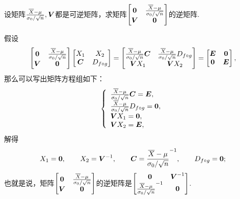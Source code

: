 \begin{example}
设矩阵\(\P,\Q\)都是可逆矩阵，求矩阵\(\begin{bmatrix}
	\z & \P \\
	\Q & \z
\end{bmatrix}\)的逆矩阵.
\begin{solution}
假设\[
	\begin{bmatrix}
		\z & \P \\
		\Q & \z
	\end{bmatrix}
	\begin{bmatrix}
		\A & \B \\
		\C & \D
	\end{bmatrix}
	= \begin{bmatrix}
		\P \C & \P \D \\
		\Q \A & \Q \B
	\end{bmatrix}
	= \begin{bmatrix}
		\E & \z \\
		\z & \E
	\end{bmatrix},
\]
那么可以写出矩阵方程组如下：\[
	\left\{ \begin{array}{l}
		\P \C = \E, \\
		\P \D = \z, \\
		\Q \A = \z, \\
		\Q \B = \E,
	\end{array} \right.
\]
解得\[
	\A = \z, \qquad
	\B = \Q^{-1}, \qquad
	\C = \P^{-1}, \qquad
	\D = \z;
\]
也就是说，矩阵\(\begin{bmatrix}
	\z & \P \\
	\Q & \z
\end{bmatrix}\)的逆矩阵是\(\begin{bmatrix}
	\z & \Q^{-1} \\
	\P^{-1} & \z
\end{bmatrix}\).
\end{solution}
\end{example}
